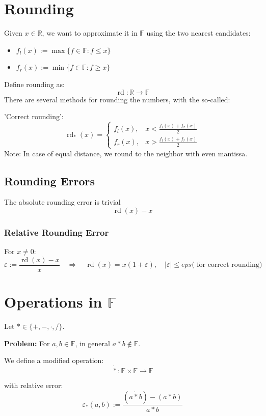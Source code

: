 \documentclass{article}
\begin{document}
\section{Rounding}

Given $x \in \mathbb{R}$, we want to approximate it in $\mathbb{F}$ using the two nearest candidates:
\begin{itemize}
  \item $f_l(x) := \max\{f \in \mathbb{F} : f \leq x\}$
  \item $f_r(x) := \min\{f \in \mathbb{F} : f \geq x\}$
\end{itemize}

Define rounding as:
\[
\operatorname{rd}: \mathbb{R} \to \mathbb{F}
\]
There are several methods for rounding the numbers, with the so-called: 

'Correct rounding':
\[
\operatorname{rd}_*(x) =
\begin{cases}
  f_l(x), & x < \frac{f_l(x) + f_r(x)}{2} \\
  f_r(x), & x > \frac{f_l(x) + f_r(x)}{2}
\end{cases}
\]
Note: In case of equal distance, we round to the neighbor with even mantissa.
\subsection{Rounding Errors}
The absolute rounding error is trivial
\[\operatorname{rd}(x) - x\]
\subsubsection{Relative Rounding Error}

For $x \neq 0$:
\[
\varepsilon := \frac{\operatorname{rd}(x) - x}{x}
\quad \Rightarrow \quad
\operatorname{rd}(x) = x(1 + \varepsilon), \quad |\varepsilon| \leq eps \text{( for correct rounding)}
\]

\section{Operations in $\mathbb{F}$}

Let $* \in \{+, -, \cdot, /\}$.

\textbf{Problem:} For $a, b \in \mathbb{F}$, in general $a * b \notin \mathbb{F}$.

We define a modified operation:
\[
\dot{*} : \mathbb{F} \times \mathbb{F} \to \mathbb{F}
\]

with relative error:
\[
\varepsilon_*(a,b) := \frac{(a \dot{*} b) - (a * b)}{a * b}
\]
\end{document}
